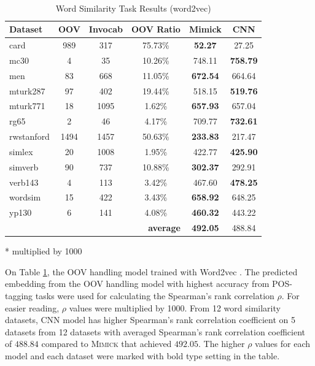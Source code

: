     \begin{table}[!ht]
      \begin{threeparttable} 
      \begin{center}
        \caption{Word Similarity Task Results (word2vec)}
        ~\\
        \label{tab:wordsim:word2vec}
        \begin{tabular}{l|c|c|c|c|c}
          \textbf{Dataset} & \textbf{OOV} & \textbf{Invocab} & \textbf{OOV Ratio} & \textbf{Mimick}\tnote{*} & \textbf{CNN}\tnote{*}\\
          \hline
          card & 989 & 317 & 75.73\% & \textbf{52.27} & 27.25\\
          mc30 & 4 & 35 & 10.26\% & 748.11 & \textbf{758.79}\\
          men & 83 & 668 & 11.05\% & \textbf{672.54} & 664.64\\
          mturk287 & 97 & 402 & 19.44\% & 518.15 & \textbf{519.76}\\
          mturk771 & 18 & 1095 & 1.62\% & \textbf{657.93} & 657.04\\
          rg65 & 2 & 46 & 4.17\% & 709.77 & \textbf{732.61}\\
          rwstanford & 1494 & 1457 & 50.63\% & \textbf{233.83} & 217.47\\
          simlex & 20 & 1008 & 1.95\% & 422.77 & \textbf{425.90}\\
          simverb & 90 & 737 & 10.88\% & \textbf{302.37} & 292.91\\
          verb143 & 4 & 113 & 3.42\% & 467.60 & \textbf{478.25}\\
          wordsim & 15 & 422 & 3.43\% & \textbf{658.92} & 648.25\\
          yp130 & 6 & 141 & 4.08\% & \textbf{460.32} & 443.22\\
          \hline
          \multicolumn{4}{r|}{\textbf{average}} & \textbf{492.05} & 488.84\\
        \end{tabular}
        \begin{tablenotes}
          \item[*] multiplied by 1000
        \end{tablenotes}
      \end{center}
      
    \end{threeparttable} 
    \end{table}
    On Table \ref{tab:wordsim:word2vec}, the OOV handling model trained with
    Word2vec \citep{Distributed2013mikolov}. The predicted embedding
    from the OOV handling model with highest accuracy from POS-tagging tasks
    were used for calculating the Spearman's rank correlation $\rho$.
    For easier reading, $\rho$ values were multiplied by 1000. From
    12 word similarity datasets, CNN model has higher Spearman's rank
    correlation coefficient on 5 datasets from 12 datasets with
    averaged Spearman's rank correlation coefficient of $488.84$ compared to
    \textsc{Mimick} that achieved $492.05$. The higher $\rho$ values
    for each model and each dataset were marked with bold type setting
    in the table.

